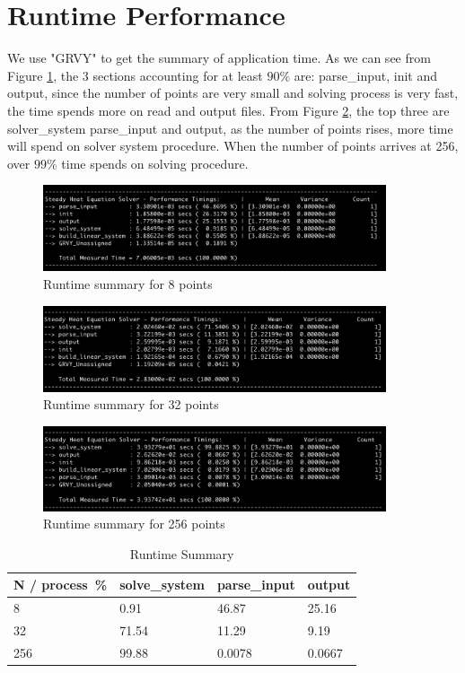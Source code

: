 \documentclass[a4paper]{article}
\begin{document}
\section{Runtime Performance}
We use "GRVY" to get the summary of application time. As we can see from Figure \ref{run8}, the 3 sections accounting for at least $90\%$ are: parse\_input, init and output, since the number of points are very small and solving process is very fast, the time spends more on read and output files. From Figure \ref{run32}, the top three are solver\_system parse\_input and output, as the number of points rises, more time will spend on solver system procedure. When the number of points arrives at 256, over $99\%$ time spends on solving procedure.

\begin{figure}[htbp]
\centering
\includegraphics[width=0.9\textwidth]{runtime8.png}
\caption{\label{run8}Runtime summary for 8 points}
\end{figure}

\begin{figure}[htbp]
\centering
\includegraphics[width=0.9\textwidth]{run32.png}
\caption{\label{run32}Runtime summary for 32 points}
\end{figure}

\begin{figure}[htbp]
\centering
\includegraphics[width=0.9\textwidth]{run256.png}
\caption{\label{run256}Runtime summary for 256 points}
\end{figure}

\begin{table}[!htbp]
\centering
\begin{tabular}{l|lll}
\hline
N / process\ \% & solve\_system & parse\_input & output \\
\hline
8  & 0.91 & 46.87  & 25.16\\
32  & 71.54  & 11.29 & 9.19\\
256 & 99.88 & 0.0078 & 0.0667\\
\hline
\end{tabular}
\caption{\label{table}Runtime Summary}
\end{table}
\end{document}
